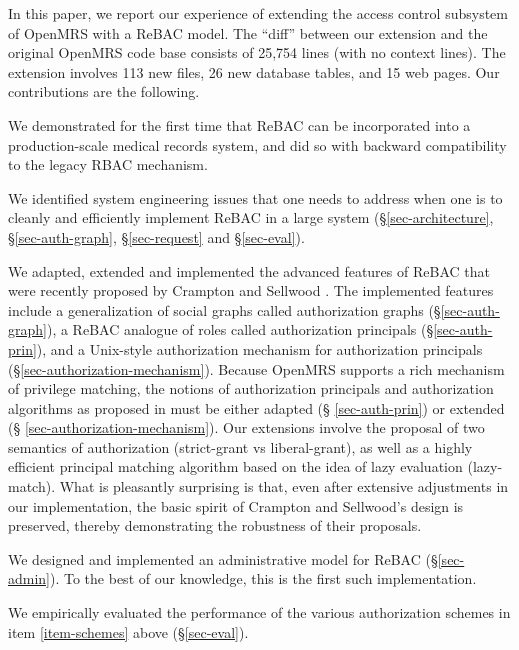 \documentclass{acm_proc_article-sp}
\begin{document}
In this paper, we report our experience of extending the access
control subsystem of OpenMRS with a ReBAC model.  The ``diff'' between
our extension and the original OpenMRS code base consists of 25,754
lines (with no context lines).  The extension involves 113 new files,
26 new database tables, and 15 web pages.  Our contributions are the
following.
\begin{compactenum}
\item We demonstrated for the first time that ReBAC can be
  incorporated into a production-scale medical records system, and
  did so with backward compatibility to the legacy RBAC mechanism.
\item We identified system engineering issues that one needs to
  address when one is to cleanly and efficiently implement ReBAC in a
  large system (\S \ref{sec-architecture}, \S\ref{sec-auth-graph},
  \S\ref{sec-request} and \S\ref{sec-eval}).
\item We adapted, extended and implemented the advanced features of
  ReBAC that were recently proposed by Crampton and Sellwood
  \cite{Crampton-Sellwood:2014}.  The implemented features include a
  generalization of social graphs called authorization graphs
  (\S\ref{sec-auth-graph}), a ReBAC analogue of roles called
  authorization principals (\S \ref{sec-auth-prin}), and a Unix-style
  authorization mechanism for authorization principals
  (\S\ref{sec-authorization-mechanism}).  Because OpenMRS supports a
  rich mechanism of privilege matching, the notions of authorization
  principals and authorization algorithms as proposed in
  \cite{Crampton-Sellwood:2014} must be either adapted (\S
  \ref{sec-auth-prin}) or extended (\S
  \ref{sec-authorization-mechanism}).  Our extensions involve the
  proposal of two semantics of authorization (strict-grant vs
  liberal-grant), as well as a highly efficient principal matching
  algorithm based on the idea of lazy evaluation (lazy-match).  What
  is pleasantly surprising is that, even after extensive adjustments
  in our implementation, the basic spirit of Crampton and Sellwood's
  design is preserved, thereby demonstrating the robustness of their
  proposals.\label{item-schemes}
\item We designed and implemented an administrative model for ReBAC
  (\S \ref{sec-admin}).  To the best of our knowledge, this is the
  first such implementation.
\item We empirically evaluated the performance of the
   various authorization schemes in item \ref{item-schemes} above
   (\S \ref{sec-eval}).
\end{compactenum}
\end{document}
